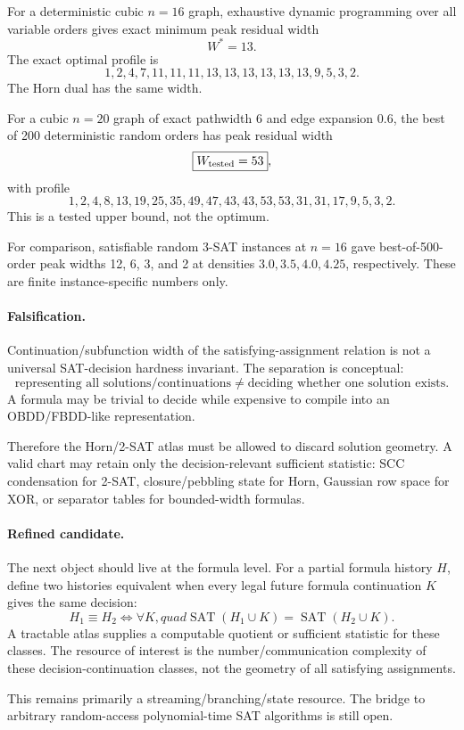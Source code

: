 For a deterministic cubic $n=16$ graph, exhaustive dynamic programming over all variable
orders gives exact minimum peak residual width
\[
\boxed{W^*=13}.
\]
The exact optimal profile is
\[
1,2,4,7,11,11,11,13,13,13,13,13,13,9,5,3,2.
\]
The Horn dual has the same width.

For a cubic $n=20$ graph of exact pathwidth 6 and edge expansion 0.6, the best of 200
deterministic random orders has peak residual width
\[
\boxed{W_{\rm tested}=53},
\]
with profile
\[
1,2,4,8,13,19,25,35,49,47,43,43,53,53,31,31,17,9,5,3,2.
\]
This is a tested upper bound, not the optimum.

For comparison, satisfiable random 3-SAT instances at $n=16$ gave best-of-500-order peak
widths 12, 6, 3, and 2 at densities $3.0,3.5,4.0,4.25$, respectively. These are finite
instance-specific numbers only.

\paragraph{Falsification.}
Continuation/subfunction width of the satisfying-assignment relation is not a universal
SAT-decision hardness invariant. The separation is conceptual:
\[
\boxed{
\text{representing all solutions/continuations}
\neq
\text{deciding whether one solution exists}.
}
\]
A formula may be trivial to decide while expensive to compile into an OBDD/FBDD-like
representation.

Therefore the Horn/2-SAT atlas must be allowed to discard solution geometry. A valid chart
may retain only the decision-relevant sufficient statistic: SCC condensation for 2-SAT,
closure/pebbling state for Horn, Gaussian row space for XOR, or separator tables for
bounded-width formulas.

\paragraph{Refined candidate.}
The next object should live at the formula level. For a partial formula history $H$, define
two histories equivalent when every legal future formula continuation $K$ gives the same
decision:
\[
H_1\equiv H_2
\iff
\forall K,quad
\operatorname{SAT}(H_1\cup K)=\operatorname{SAT}(H_2\cup K).
\]
A tractable atlas supplies a computable quotient or sufficient statistic for these classes.
The resource of interest is the number/communication complexity of these
decision-continuation classes, not the geometry of all satisfying assignments.

This remains primarily a streaming/branching/state resource. The bridge to arbitrary
random-access polynomial-time SAT algorithms is still open.

